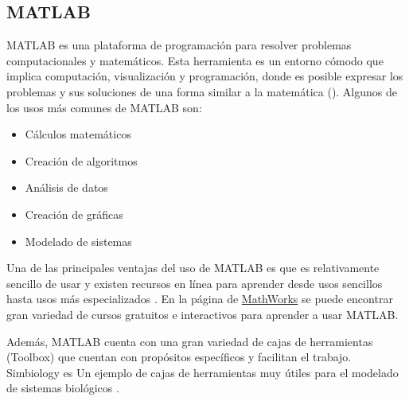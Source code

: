 \documentclass[11pt, letterpaper, spanish]{article}
\begin{document}
{{    \subsection{MATLAB}
    \par{MATLAB es una plataforma de programación para resolver problemas computacionales y matemáticos. Esta herramienta es un entorno cómodo que implica computación, visualización y programación, donde es posible expresar los problemas y sus soluciones de una forma similar a la matemática (\cite{gilat_2017}). Algunos de los usos más comunes de MATLAB son:}
    \begin{itemize}
        \item Cálculos matemáticos
        \item Creación de algoritmos
        \item Análisis de datos
        \item Creación de gráficas
        \item Modelado de sistemas
    \end{itemize} 
    \par{Una de las principales ventajas del uso de MATLAB es que es relativamente sencillo de usar y existen recursos en línea para aprender desde usos sencillos hasta usos más especializados \cite{Kirouac2019}. En la página de \href{https://la.mathworks.com/support/learn-with-matlab-tutorials.html}{MathWorks} se puede encontrar gran variedad de cursos gratuitos e interactivos para aprender a usar MATLAB.}
    \par{Además, MATLAB cuenta con una gran variedad de cajas de herramientas (Toolbox) que cuentan con propósitos específicos y facilitan el trabajo. Simbiology es Un ejemplo de cajas de herramientas muy útiles para el modelado de sistemas biológicos \cite{Park2019}.}
}}
\end{document}
